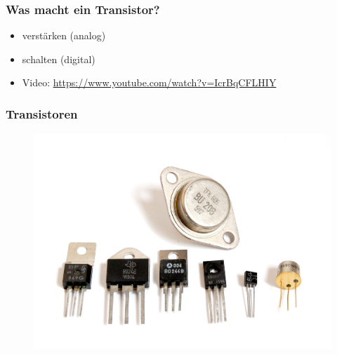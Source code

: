 

\subtitle{Technik Klasse E 13: \\
          Transistor \& Verstärker \\[2em]}
\date{Stand 25.11.2015}


\begin{frame}
\frametitle{Was macht ein Transistor?}
   	\begin{itemize}
	
	 \item verstärken (analog)
         \item schalten (digital)
         \item Video: \url{https://www.youtube.com/watch?v=IcrBqCFLHIY}
  	\end{itemize}	
\end{frame}
\begin{frame}
  \frametitle{Transistoren}
  \begin{figure}
    \includegraphics[width=\textwidth,height=.65\textheight,keepaspectratio]{e13/Transistors-white.jpg}
  \end{figure}
\end{frame}
